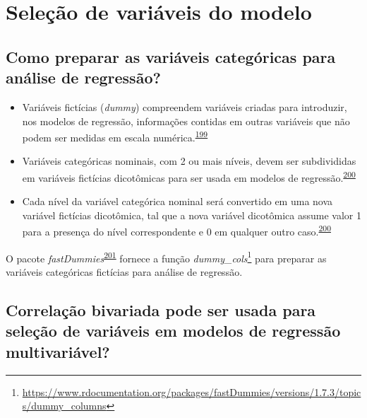 \documentclass[
  a4paper,
]{book}
\renewcommand{\href}[2]{#2\footnote{\url{#1}}}
\newenvironment{infobox}[1]
  {
  \begin{itemize}
  \renewcommand{\labelitemi}{
    \raisebox{-.7\height}[0pt][0pt]{
      {\setkeys{Gin}{width=3em,keepaspectratio}
        \texttt{[image: \#1]}}
    }
  }
  \setlength{\fboxsep}{1em}
  \begin{blackbox}
  \item
  }
  {
  \end{blackbox}
  \end{itemize}
  }
\begin{document}
\hypertarget{selecao}{%
\section{Seleção de variáveis do modelo}\label{selecao}}

\hypertarget{como-preparar-as-variuxe1veis-categuxf3ricas-para-anuxe1lise-de-regressuxe3o}{%
\subsection{Como preparar as variáveis categóricas para análise de regressão?}\label{como-preparar-as-variuxe1veis-categuxf3ricas-para-anuxe1lise-de-regressuxe3o}}

\begin{itemize}
\item
  Variáveis fictícias (\emph{dummy}) compreendem variáveis criadas para introduzir, nos modelos de regressão, informações contidas em outras variáveis que não podem ser medidas em escala numérica.\textsuperscript{\protect\hyperlink{ref-suits1957}{199}}
\item
  Variáveis categóricas nominais, com 2 ou mais níveis, devem ser subdivididas em variáveis fictícias dicotômicas para ser usada em modelos de regressão.\textsuperscript{\protect\hyperlink{ref-Healy1995}{200}}
\item
  Cada nível da variável categórica nominal será convertido em uma nova variável fictícias dicotômica, tal que a nova variável dicotômica assume valor 1 para a presença do nível correspondente e 0 em qualquer outro caso.\textsuperscript{\protect\hyperlink{ref-Healy1995}{200}}
\end{itemize}

\begin{infobox}{images/Rlogo}
O pacote \emph{fastDummies}\textsuperscript{\protect\hyperlink{ref-fastDummies}{201}} fornece a função \href{https://www.rdocumentation.org/packages/fastDummies/versions/1.7.3/topics/dummy_columns}{\emph{dummy\_cols}} para preparar as variáveis categóricas fictícias para análise de regressão.

\end{infobox}

\hypertarget{correlauxe7uxe3o-bivariada-pode-ser-usada-para-seleuxe7uxe3o-de-variuxe1veis-em-modelos-de-regressuxe3o-multivariuxe1vel}{%
\subsection{Correlação bivariada pode ser usada para seleção de variáveis em modelos de regressão multivariável?}\label{correlauxe7uxe3o-bivariada-pode-ser-usada-para-seleuxe7uxe3o-de-variuxe1veis-em-modelos-de-regressuxe3o-multivariuxe1vel}}
\end{document}
